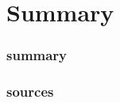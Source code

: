 \section{Summary}
\begin{frame}
	\frametitle{summary}
\end{frame}
\begin{frame}
	\frametitle{sources}
\end{frame}